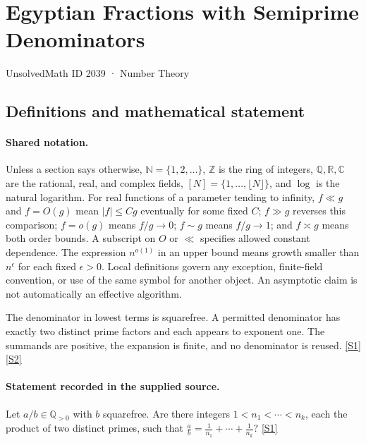 \documentclass[11pt,a4paper]{article}
\newcommand{\N}{\mathbb{N}}
\newcommand{\Z}{\mathbb{Z}}
\newcommand{\Q}{\mathbb{Q}}
\newcommand{\R}{\mathbb{R}}
\newcommand{\C}{\mathbb{C}}
\newcommand{\sref}[2]{\hyperlink{source:#1:#2}{[S#2]}}
\begin{document}

\setcounter{section}{2038}

\section{Egyptian Fractions with Semiprime Denominators}\label{2039}

{\small\sffamily UnsolvedMath ID 2039 · Number Theory}

\subsection{Definitions and mathematical statement}

\paragraph{Shared notation.}Unless a section says otherwise, $\N=\{1,2,\ldots\}$,
$\Z$ is the ring of integers, $\Q,\R,\C$ are the rational, real, and complex
fields, $[N]=\{1,\ldots,\lfloor N\rfloor\}$, and $\log$ is the natural
logarithm. For real functions of a parameter tending to infinity,
$f\ll g$ and $f=O(g)$ mean $|f|\leq Cg$ eventually for some fixed $C$;
$f\gg g$ reverses this comparison; $f=o(g)$ means $f/g\to0$;
$f\sim g$ means $f/g\to1$; and $f\asymp g$ means both order bounds.
A subscript on $O$ or $\ll$ specifies allowed constant dependence.
The expression $n^{o(1)}$ in an upper bound means growth smaller than
$n^\epsilon$ for each fixed $\epsilon>0$. Local definitions govern any
exception, finite-field convention, or use of the same symbol for another
object. An asymptotic claim is not automatically an effective algorithm.



The denominator in lowest terms is squarefree. A permitted denominator has exactly two distinct prime factors and each appears to exponent one. The summands are positive, the expansion is finite, and no denominator is reused. \sref{2039}{1} \sref{2039}{2}

\paragraph{Statement recorded in the supplied source.}
Let $a/b\in \mathbb{Q}_{>0}$ with $b$ squarefree. Are there integers $1<n_1<\cdots<n_k$, each the product of two distinct primes, such that $ \frac{a}{b}=\frac{1}{n_1}+\cdots+\frac{1}{n_k}? $ \sref{2039}{1}
\end{document}
